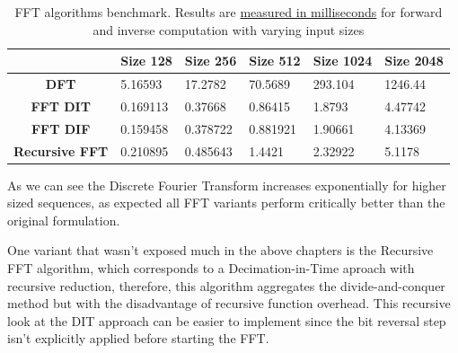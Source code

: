 \documentclass[
  oneside,
  11pt, a4paper,
  footinclude=true,
  headinclude=true,
  cleardoublepage=empty
]{scrbook}
\begin{document}
\begin{table}[h]
    \centering
    \normalsize
    \sffamily
    \renewcommand{\arraystretch}{1.5}%
    \begin{tabular}{|c|l|l|l|l|l|}
        \hline
        \multicolumn{1}{|l|}{} & \multicolumn{1}{c|}{\textbf{Size 128}} & \multicolumn{1}{c|}{\textbf{Size 256}} & \multicolumn{1}{c|}{\textbf{Size 512}} & \multicolumn{1}{c|}{\textbf{Size 1024}} & \multicolumn{1}{c|}{\textbf{Size 2048}} \\ \hline
        \textbf{DFT}           & 5.16593                                & 17.2782                                & 70.5689                                & 293.104                                 & 1246.44                                 \\ \hline
        \textbf{FFT  DIT}      & 0.169113                               & 0.37668                                & 0.86415                                & 1.8793                                  & 4.47742                                 \\ \hline
        \textbf{FFT DIF}       & 0.159458                               & 0.378722                               & 0.881921                               & 1.90661                                 & 4.13369                                 \\ \hline
        \textbf{Recursive FFT} & 0.210895                               & 0.485643                               & 1.4421                                 & 2.32922                                 & 5.1178                                  \\ \hline
    \end{tabular}
    \caption{FFT algorithms benchmark. Results are \underline{measured in milliseconds} for forward and inverse computation with varying input sizes}
    \label{tab:benchmarking}
\end{table}

As we can see the Discrete Fourier Transform increases exponentially for higher sized sequences, as expected all FFT variants perform critically better than the original formulation.

One variant that wasn't exposed much in the above chapters is the Recursive FFT algorithm, which corresponds to a Decimation-in-Time aproach with recursive reduction, therefore, this algorithm aggregates the divide-and-conquer method but with the disadvantage of recursive function overhead. This recursive look at the DIT approach can be easier to implement since the bit reversal step isn't explicitly applied before starting the FFT.
\end{document}
